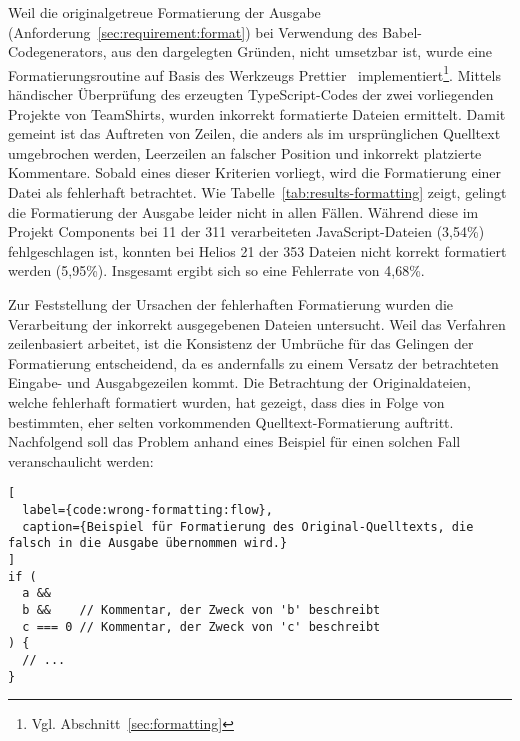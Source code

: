Weil die originalgetreue Formatierung der Ausgabe (Anforderung~\ref{sec:requirement:format}) bei Verwendung des Babel-Codegenerators, aus den dargelegten Gründen, nicht umsetzbar ist, wurde eine Formatierungsroutine auf Basis des Werkzeugs Prettier~\autocite{SOFTWARE:PRETTIER} implementiert\footnote{Vgl. Abschnitt~\ref{sec:formatting}}.
Mittels händischer Überprüfung des erzeugten TypeScript-Codes der zwei vorliegenden Projekte von TeamShirts, wurden inkorrekt formatierte Dateien ermittelt. Damit gemeint ist das Auftreten von Zeilen, die anders als im ursprünglichen Quelltext umgebrochen werden, Leerzeilen an falscher Position und inkorrekt platzierte Kommentare. Sobald eines dieser Kriterien vorliegt, wird die Formatierung einer Datei als fehlerhaft betrachtet. Wie Tabelle~\ref{tab:results-formatting} zeigt, gelingt die Formatierung der Ausgabe leider nicht in allen Fällen. Während diese im Projekt Components bei 11 der 311 verarbeiteten JavaScript-Dateien (3,54\%) fehlgeschlagen ist, konnten bei Helios 21 der 353 Dateien nicht korrekt formatiert werden (5,95\%). Insgesamt ergibt sich so eine Fehlerrate von 4,68\%.

\bigbreak


\medbreak
Zur Feststellung der Ursachen der fehlerhaften Formatierung wurden die Verarbeitung der inkorrekt ausgegebenen Dateien untersucht. Weil das Verfahren zeilenbasiert arbeitet, ist die Konsistenz der Umbrüche für das Gelingen der Formatierung entscheidend, da es andernfalls zu einem Versatz der betrachteten Eingabe- und Ausgabgezeilen kommt. Die Betrachtung der Originaldateien, welche fehlerhaft formatiert wurden, hat gezeigt, dass dies in Folge von bestimmten, eher selten vorkommenden Quelltext-Formatierung auftritt. Nachfolgend soll das Problem anhand eines Beispiel für einen solchen Fall veranschaulicht werden:

\begin{lstlisting}[
  label={code:wrong-formatting:flow},
  caption={Beispiel für Formatierung des Original-Quelltexts, die falsch in die Ausgabe übernommen wird.}
]
if (
  a &&
  b &&    // Kommentar, der Zweck von 'b' beschreibt
  c === 0 // Kommentar, der Zweck von 'c' beschreibt
) {
  // ...
}
\end{lstlisting}

